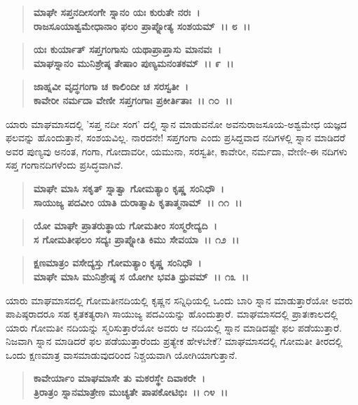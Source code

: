 \begin{verse}
\textbf{ಮಾಘೇ ಸಪ್ತನದೀಸಂಗೇ ಸ್ನಾನಂ ಯಃ ಕುರುತೇ ನರಃ~।}\\\textbf{ರಾಜಸೂಯಾಶ್ವಮೇಧಾನಾಂ ಫಲಂ ಪ್ರಾಪ್ನೋತ್ಯ ಸಂಶಯಮ್~।। ೮~।। }
\end{verse}

\begin{verse}
\textbf{ಯಃ ಕುರ್ಯಾತ್ ಸಪ್ತಗಂಗಾಸು ಯಥಾಪ್ರಾಪ್ತಾಸು ಮಾನವಃ~।}\\\textbf{ಮಾಘಸ್ನಾನಂ ಮುನಿಶ್ರೇಷ್ಠ ತೇಷಾಂ ಪುಣ್ಯಮನಂತಕಮ್~।। ೯~।। }
\end{verse}

\begin{verse}
\textbf{ಜಾಹ್ನವೀ ವೃದ್ಧಗಂಗಾ ಚ ಕಾಲಿಂದೀ ಚ ಸರಸ್ವತೀ~।}\\\textbf{ಕಾವೇರೀ ನರ್ಮದಾ ವೇಣೀ ಸಪ್ತಗಂಗಾಃ ಪ್ರಕೀರ್ತಿತಾಃ~।। ೧೦~।।}
\end{verse}

ಯಾರು ಮಾಘಮಾಸದಲ್ಲಿ 'ಸಪ್ತ ನದೀ ಸಂಗ' ದಲ್ಲಿ ಸ್ನಾನ ಮಾಡುವನೋ ಅವನು\break ರಾಜಸೂಯ-ಅಶ್ವಮೇಧ ಯಜ್ಞದ ಫಲವನ್ನು ಹೊಂದುತ್ತಾನೆ, ಸಂಶಯವಿಲ್ಲ. ನಾರದನೇ! ಸಪ್ತಗಂಗಾ ಎಂದು ಪ್ರಸಿದ್ದವಾದ ನದಿಗಳಲ್ಲಿ ಸ್ನಾನ ಮಾಡಿದರೆ ಅವರ ಪುಣ್ಯವು ಅನಂತ, ಗಂಗಾ, ಗೋದಾವರೀ, ಯಮುನಾ, ಸರಸ್ವತೀ, ಕಾವೇರೀ, ನರ್ಮದಾ, ವೇಣೀ-ಈ ನದಿಗಳು ಸಪ್ತ ಗಂಗಾನದಿಗಳೆಂದು ಪ್ರಸಿದ್ಧವಾಗಿವೆ.

\begin{verse}
\textbf{ಮಾಘೇ ಮಾಸಿ ಸಕೃತ್ ಸ್ನಾತ್ವಾ ಗೋಮತ್ಯಾಂ ಕೃಷ್ಣ ಸಂನಿಧೌ~।}\\\textbf{ಸಾಯುಜ್ಯ ಪದವೀಂ ಯಾತಿ ದುರಾತ್ಮಾಪಿ ಕೃತಾತ್ಮನಾಮ್~।। ೧೧~।। }
\end{verse}

\begin{verse}
\textbf{ಯೋ ಮಾಘೇ ಪ್ರಾತರುತ್ಥಾಯ ಗೋಮತೀಂ ಸಂಸ್ಮರೇದ್ಯದಿ~।}\\\textbf{ಸ ಗೋಮತೀಫಲಂ ಸದ್ಯಃ ಪ್ರಾಪ್ನೋತಿ ಕಿಮು ಸೇವಯಾ~।। ೧೨~।।} 
\end{verse}

\begin{verse}
\textbf{ಕ್ಷಣಮಾತ್ರಂ ವಸೇದ್ಯಸ್ತು ಗೋಮತ್ಯಾಂ ಕೃಷ್ಣ ಸಂನಿಧೌ~।}\\\textbf{ಮಾಘೇ ಮಾಸಿ ಮುನಿಶ್ರೇಷ್ಠ ಸ ಯೋಗೀ ಭವತಿ ಧ್ರುವಮ್~।। ೧೩~।।}
\end{verse}

ಯಾರು ಮಾಘಮಾಸದಲ್ಲಿ ಗೋಮತೀನದಿಯಲ್ಲಿ ಕೃಷ್ಣನ ಸನ್ನಿಧಿಯಲ್ಲಿ ಒಂದು ಬಾರಿ ಸ್ನಾನ ಮಾಡುತ್ತಾರೆಯೋ ಅವರು ಪಾಪಿಷ್ಠರಾದರೂ ಸಹ ಕೃತಕತ್ಯರಾಗಿ ಸಾಯುಜ್ಯ ಪದವಿಯನ್ನು ಹೊಂದುತ್ತಾರೆ. ಮಾಘಮಾಸದಲ್ಲಿ ಪ್ರಾತಃಕಾಲದಲ್ಲಿ ಯಾರು ಗೋಮತೀ ನದಿಯನ್ನು ಸ್ಮರಿಸುತ್ತಾರೆಯೋ ಅವರು ಆ ನದಿಯಲ್ಲಿ ಸ್ನಾನ ಮಾಡಿದಷ್ಟೇ ಫಲ ಪಡೆಯುತ್ತಾರೆ. ನಿಜವಾಗಿ ಸ್ನಾನ ಮಾಡಿದರೆ ಫಲ ಪಡೆಯುತ್ತಾರೆಂದು ಪ್ರತ್ಯೇಕ ಹೇಳಬೇಕೆ? ಮಾಘಮಾಸದಲ್ಲಿ ಗೋಮತೀ ತೀರದಲ್ಲಿ ಒಂದು ಕ್ಷಣಮಾತ್ರ ವಾಸಮಾಡುವುದರಿಂದ ನಿಶ್ಚಯವಾಗಿ ಯೋಗಿಯಾಗುತ್ತಾನೆ.

\begin{verse}
\textbf{ಕಾವೇರ್ಯಾಂ ಮಾಘಮಾಸೇ ತು ಮಕರಸ್ಥೇ ದಿವಾಕರೇ~।}\\\textbf{ತ್ರಿರಾತ್ರಂ ಸ್ನಾನಮಾತ್ರೇಣ ಮುಚ್ಯತೇ ಪಾಪಕೋಟಿಭಿಃ~।। ೧೪~।। }
\end{verse}

